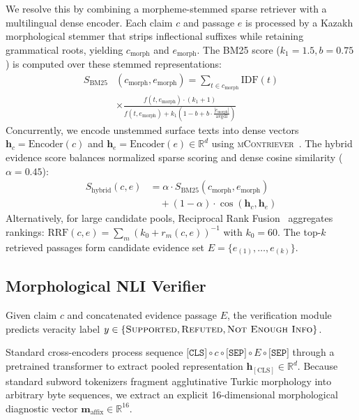 We resolve this by combining a morpheme-stemmed sparse retriever with a multilingual dense encoder. Each claim $c$ and passage $e$ is processed by a Kazakh morphological stemmer that strips inflectional suffixes while retaining grammatical roots, yielding $c_{\text{morph}}$ and $e_{\text{morph}}$. The BM25 score ($k_1 = 1.5, b = 0.75$) is computed over these stemmed representations:
\begin{equation}
\label{eq:bm25}
\begin{split}
S_{\text{BM25}}&(c_{\text{morph}}, e_{\text{morph}}) = \sum_{t \in c_{\text{morph}}} \mathrm{IDF}(t) \\
&\times \frac{f(t, e_{\text{morph}}) \cdot (k_1 + 1)}{f(t, e_{\text{morph}}) + k_1 \left(1 - b + b \cdot \frac{|e_{\text{morph}}|}{\mathrm{avgdl}}\right)}
\end{split}
\end{equation}
Concurrently, we encode unstemmed surface texts into dense vectors $\mathbf{h}_c = \mathrm{Encoder}(c)$ and $\mathbf{h}_e = \mathrm{Encoder}(e) \in \mathbb{R}^d$ using \textsc{mContriever}~\citep{izacard2022mcontriever}. The hybrid evidence score balances normalized sparse scoring and dense cosine similarity ($\alpha = 0.45$):
\begin{equation}
\label{eq:hybrid_retrieval}
\begin{split}
S_{\text{hybrid}}(c, e) &= \alpha \cdot S_{\text{BM25}}(c_{\text{morph}}, e_{\text{morph}}) \\
&\quad + (1 - \alpha) \cdot \cos\left(\mathbf{h}_c, \mathbf{h}_e\right)
\end{split}
\end{equation}
Alternatively, for large candidate pools, Reciprocal Rank Fusion~\citep{mudunuri-etal-2026-bounded} aggregates rankings: $\mathrm{RRF}(c, e) = \sum_{m} (k_0 + r_m(c, e))^{-1}$ with $k_0 = 60$. The top-$k$ retrieved passages form candidate evidence set $E = \{e_{(1)}, \dots, e_{(k)}\}$.

\subsection{Morphological NLI Verifier}
Given claim $c$ and concatenated evidence passage $E$, the verification module predicts veracity label $y \in \{\textsc{Supported}, \textsc{Refuted}, \textsc{Not Enough Info}\}$.

Standard cross-encoders process sequence $\texttt{[CLS]} \circ c \circ \texttt{[SEP]} \circ E \circ \texttt{[SEP]}$ through a pretrained transformer to extract pooled representation $\mathbf{h}_{[\text{CLS}]} \in \mathbb{R}^d$. Because standard subword tokenizers fragment agglutinative Turkic morphology into arbitrary byte sequences, we extract an explicit 16-dimensional morphological diagnostic vector $\mathbf{m}_{\text{affix}} \in \mathbb{R}^{16}$.

